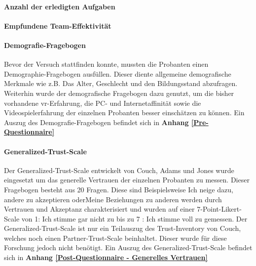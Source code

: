\documentclass[a4paper,11pt]{article}%
\renewcommand{\\}{\vspace*{0.5\baselineskip} \newline}
\begin{document}
\paragraph{Anzahl der erledigten Aufgaben}
\paragraph{Empfundene Team-Effektivität}		
				
		\paragraph{Demografie-Fragebogen}
Bevor der Versuch stattfinden konnte, mussten die Probanten einen Demographie-Fragebogen ausfüllen. Dieser diente allgemeine demografische Merkmale wie z.B. Das Alter, Geschlecht und den Bildungsstand abzufragen. Weiterhin wurde der demografische Fragebogen dazu genutzt, um die bisher vorhandene \ac{vr}-Erfahrung, die PC- und Internetaffinität sowie die Videospielerfahrung der einzelnen Probanten besser einschätzen zu können.
\\Ein Auszug des Demografie-Fragebogen befindet sich in \textbf{Anhang \ref{Pre-Questionnaire}}

		\paragraph{Generalized-Trust-Scale}
Der Generalized-Trust-Scale entwickelt von Couch, Adams und Jones \citep{couch1996assessment} wurde eingesetzt um das generelle Vertrauen der einzelnen Probanten zu messen.
Dieser Fragebogen besteht aus 20 Fragen. Diese sind Beispielsweise \dq{}Ich neige dazu, andere zu akzeptieren \dq{} oder\dq{}Meine Beziehungen zu anderen werden durch Vertrauen und Akzeptanz charakterisiert \dq{} und wurden auf einer 7-Point-Likert-Scale von \dq{}1: Ich stimme gar nicht zu\dq{} bis zu \dq{}7 : Ich stimme voll zu\dq{} gemessen. Der Generalized-Trust-Scale ist nur ein Teilauszug des \dq{}Trust-Inventory von Couch\dq{}, welches noch einen \dq{}Partner-Trust-Scale \dq{} beinhaltet. Dieser wurde für diese Forschung jedoch nicht benötigt. 
\\Ein Auszug des Generalized-Trust-Scale befindet sich in \textbf{Anhang \ref{Post-Questionnaire - Generelles Vertrauen}}

%			
\end{document}

